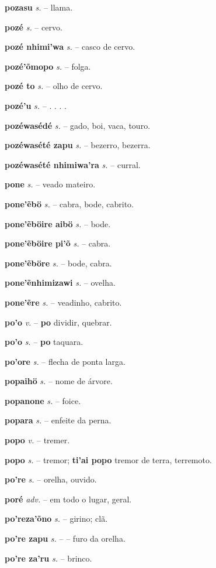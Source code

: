 \textbf{pozasu} \textit{s.} -- llama.

\textbf{pozé} \textit{s.} -- cervo.

\textbf{pozé nhimi'wa} \textit{s.} -- casco de cervo.

\textbf{pozé'õmopo} \textit{s.} -- folga.

\textbf{pozé to} \textit{s.} -- olho de cervo.

\textbf{pozé'u} \textit{s.} -- . . . .

\textbf{pozéwasédé} \textit{s.} -- gado, boi, vaca, touro.

\textbf{pozéwasété zapu} \textit{s.} -- bezerro, bezerra.

\textbf{pozéwasété nhimiwa'ra} \textit{s.} -- curral.

\textbf{pone} \textit{s.} -- veado mateiro.

\textbf{pone'ẽbö} \textit{s.} -- cabra, bode, cabrito.

\textbf{pone'ẽböire aibö} \textit{s.} -- bode.

\textbf{pone'ẽböire pi'õ} \textit{s.} -- cabra.

\textbf{pone'ẽböre} \textit{s.} -- bode, cabra.

\textbf{pone'ẽnhimizawi} \textit{s.} -- ovelha.

\textbf{pone'ẽre} \textit{s.} -- veadinho, cabrito.

\textbf{po'o} \textit{v.} -- \textbf{po} dividir, quebrar.

\textbf{po'o} \textit{s.} -- \textbf{po} taquara.

\textbf{po'ore} \textit{s.} -- flecha de ponta larga.

\textbf{popaihö} \textit{s.} -- nome de árvore.

\textbf{popanone} \textit{s.} -- foice.

\textbf{popara} \textit{s.} -- enfeite da perna.

\textbf{popo} \textit{v.} -- tremer.

\textbf{popo} \textit{s.} -- tremor; \textbf{ti'ai popo} tremor de terra, terremoto.

\textbf{po're} \textit{s.} -- orelha, ouvido.

\textbf{poré} \textit{adv.} -- em todo o lugar, geral.

\textbf{po'reza'õno} \textit{s.} -- girino; clã.

\textbf{po're zapu} \textit{s.} -- -- furo da orelha.

\textbf{po're za'ru} \textit{s.} -- brinco.

